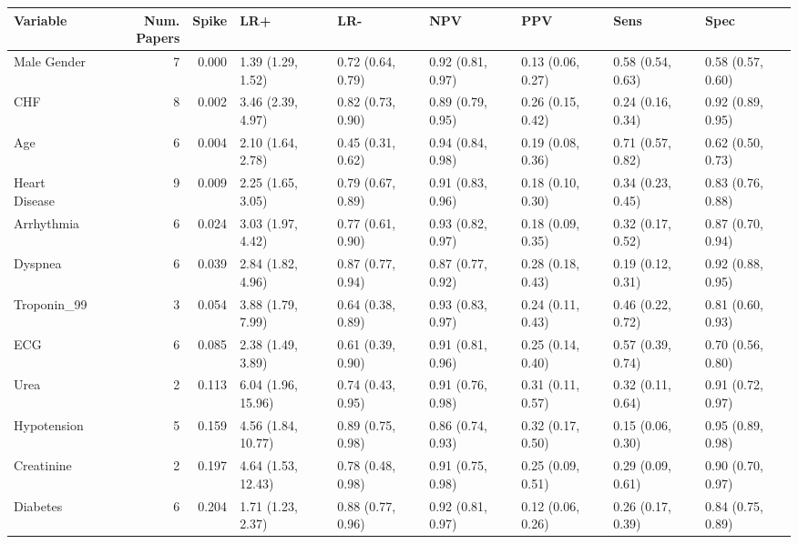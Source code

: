 \begin{table}[ht]
\centering
\begin{tabular}{lrrllllll}
  \hline
Variable & Num. Papers & Spike & LR+ & LR- & NPV & PPV & Sens & Spec \\ 
  \hline
Male Gender &    7 & 0.000 & 1.39 (1.29, 1.52) & 0.72 (0.64, 0.79) & 0.92 (0.81, 0.97) & 0.13 (0.06, 0.27) & 0.58 (0.54, 0.63) & 0.58 (0.57, 0.60) \\ 
  CHF &    8 & 0.002 & 3.46 (2.39, 4.97) & 0.82 (0.73, 0.90) & 0.89 (0.79, 0.95) & 0.26 (0.15, 0.42) & 0.24 (0.16, 0.34) & 0.92 (0.89, 0.95) \\ 
  Age &    6 & 0.004 & 2.10 (1.64, 2.78) & 0.45 (0.31, 0.62) & 0.94 (0.84, 0.98) & 0.19 (0.08, 0.36) & 0.71 (0.57, 0.82) & 0.62 (0.50, 0.73) \\ 
  Heart Disease &    9 & 0.009 & 2.25 (1.65, 3.05) & 0.79 (0.67, 0.89) & 0.91 (0.83, 0.96) & 0.18 (0.10, 0.30) & 0.34 (0.23, 0.45) & 0.83 (0.76, 0.88) \\ 
  Arrhythmia &    6 & 0.024 & 3.03 (1.97, 4.42) & 0.77 (0.61, 0.90) & 0.93 (0.82, 0.97) & 0.18 (0.09, 0.35) & 0.32 (0.17, 0.52) & 0.87 (0.70, 0.94) \\ 
  Dyspnea &    6 & 0.039 & 2.84 (1.82, 4.96) & 0.87 (0.77, 0.94) & 0.87 (0.77, 0.92) & 0.28 (0.18, 0.43) & 0.19 (0.12, 0.31) & 0.92 (0.88, 0.95) \\ 
  Troponin\_99 &    3 & 0.054 & 3.88 (1.79, 7.99) & 0.64 (0.38, 0.89) & 0.93 (0.83, 0.97) & 0.24 (0.11, 0.43) & 0.46 (0.22, 0.72) & 0.81 (0.60, 0.93) \\ 
  ECG &    6 & 0.085 & 2.38 (1.49, 3.89) & 0.61 (0.39, 0.90) & 0.91 (0.81, 0.96) & 0.25 (0.14, 0.40) & 0.57 (0.39, 0.74) & 0.70 (0.56, 0.80) \\ 
  Urea &    2 & 0.113 & 6.04 (1.96, 15.96) & 0.74 (0.43, 0.95) & 0.91 (0.76, 0.98) & 0.31 (0.11, 0.57) & 0.32 (0.11, 0.64) & 0.91 (0.72, 0.97) \\ 
  Hypotension &    5 & 0.159 & 4.56 (1.84, 10.77) & 0.89 (0.75, 0.98) & 0.86 (0.74, 0.93) & 0.32 (0.17, 0.50) & 0.15 (0.06, 0.30) & 0.95 (0.89, 0.98) \\ 
  Creatinine &    2 & 0.197 & 4.64 (1.53, 12.43) & 0.78 (0.48, 0.98) & 0.91 (0.75, 0.98) & 0.25 (0.09, 0.51) & 0.29 (0.09, 0.61) & 0.90 (0.70, 0.97) \\ 
  Diabetes &    6 & 0.204 & 1.71 (1.23, 2.37) & 0.88 (0.77, 0.96) & 0.92 (0.81, 0.97) & 0.12 (0.06, 0.26) & 0.26 (0.17, 0.39) & 0.84 (0.75, 0.89) \\ 

\end{tabular}
\end{table}
